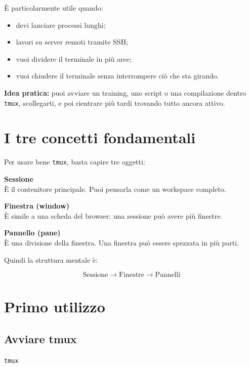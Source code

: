 \documentclass[a4paper,11pt]{article}
\begin{document}
È particolarmente utile quando:
\begin{itemize}[leftmargin=1.2cm]
    \item devi lanciare processi lunghi;
    \item lavori su server remoti tramite SSH;
    \item vuoi dividere il terminale in più aree;
    \item vuoi chiudere il terminale senza interrompere ciò che sta girando.
\end{itemize}

\begin{tipbox}
\textbf{Idea pratica:} puoi avviare un training, uno script o una compilazione dentro \texttt{tmux}, scollegarti, e poi rientrare più tardi trovando tutto ancora attivo.
\end{tipbox}

\section{I tre concetti fondamentali}
Per usare bene \texttt{tmux}, basta capire tre oggetti:

\begin{infobox}
\textbf{Sessione} \\
È il contenitore principale. Puoi pensarla come un workspace completo.

\medskip
\textbf{Finestra (window)} \\
È simile a una scheda del browser: una sessione può avere più finestre.

\medskip
\textbf{Pannello (pane)} \\
È una divisione della finestra. Una finestra può essere spezzata in più parti.
\end{infobox}

Quindi la struttura mentale è:

\[
\text{Sessione} \rightarrow \text{Finestre} \rightarrow \text{Pannelli}
\]

\section{Primo utilizzo}
\subsection{Avviare tmux}
\begin{codebox}
\texttt{tmux}
\end{codebox}
\end{document}
